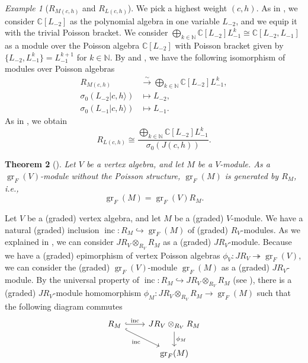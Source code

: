 \documentclass[a4paper, 12pt, reqno]{amsart}
\newtheorem{theorem}{Theorem}[section]
\theoremstyle{remark}
\newtheorem{example}[theorem]{Example}
\DeclareMathOperator{\gr}{gr}
\DeclareMathOperator{\inc}{inc}
\begin{document}
\begin{example}[$R_{M(c, h)}$ and $R_{L(c, h)}$]
  \label{exa:13}
  We pick a highest weight $(c, h)$.
  As in , we consider $\mathbb{C}[L_{-2}]$ as the polynomial algebra in one variable $L_{-2}$, and we equip it with the trivial Poisson bracket.
  We consider $\bigoplus_{k \in \mathbb{N}}\mathbb{C}[L_{-2}]L_{-1}^k \cong \mathbb{C}[L_{-2}, L_{-1}]$ as a module over the Poisson algebra $\mathbb{C}[L_{-2}]$ with Poisson bracket given by $\{L_{-2}, L_{-1}^k\} = L_{-1}^{k + 1}$ for $k \in \mathbb{N}$.
  By  and , we have the following isomorphism of modules over Poisson algebras
  \begin{align*}
    R_{M(c, h)} &\xrightarrow{\sim} \bigoplus_{k \in \mathbb{N}}\mathbb{C}[L_{-2}]L_{-1}^k, \\
    \sigma_0(L_{-2}|c, h\rangle) &\mapsto L_{-2}, \\
    \sigma_0(L_{-1}|c, h\rangle) &\mapsto L_{-1}.
  \end{align*}
  As in , we obtain
  \begin{equation*}
    R_{L(c, h)} \cong \frac{\bigoplus_{k \in \mathbb{N}}\mathbb{C}[L_{-2}]L_{-1}^k}{\sigma_0(J(c, h))}.
  \end{equation*}
\end{example}

\begin{theorem}[{\cite[Lemma 4.2]{li_abelianizing_2005}}]
  \label{thr:7}
  Let $V$ be a vertex algebra, and let $M$ be a $V$-module.
  As a $\gr_F(V)$-module without the Poisson structure, $\gr_F(M)$ is generated by $R_M$, i.e.,
  \begin{equation*}
    \gr_F(M) = \gr_F(V)R_M.
  \end{equation*}
\end{theorem}

Let $V$ be a (graded) vertex algebra, and let $M$ be a (graded) $V$-module.
We have a natural (graded) inclusion $\inc: R_M \hookrightarrow \gr_F(M)$ of (graded) $R_V$-modules.
As we explained in , we can consider $JR_V \otimes_{R_V} R_M$ as a (graded) $JR_V$-module.
Because we have a (graded) epimorphism of vertex Poisson algebras $\phi_V: JR_V \twoheadrightarrow \gr_F(V)$, we can consider the (graded) $\gr_F(V)$-module $\gr_F(M)$ as a (graded) $JR_V$-module.
By the universal property of $\inc: R_M \hookrightarrow JR_V \otimes_{R_V} R_M$ (see ), there is a (graded) $JR_V$-module homomorphism $\phi_M: JR_V \otimes_{R_V} R_M \to \gr_F(M)$ such that the following diagram commutes
\begin{equation*}
  \begin{tikzcd}
    R_M \arrow[r, "\inc", hook] \arrow[rd, "\inc"', hook] & JR_V \otimes_{R_V} R_M \arrow[d, "\phi_M"] \\
    & \gr_F(M)
  \end{tikzcd}
\end{equation*}
\end{document}
